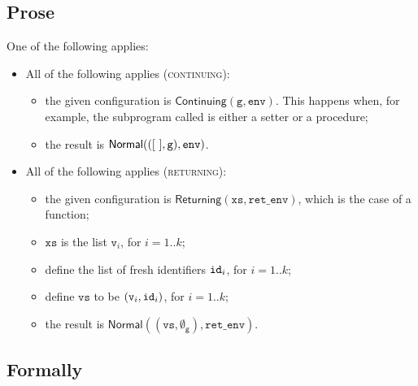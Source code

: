 \documentclass{book}
\newcommand\eqname[0]{\stackrel{\mathsmaller{\mathsf{is}}}{=}}
\newcommand\eqdef[0]{:=}
\newcommand\xgraph[0]{\textsf{g}}
\newcommand\emptygraph[0]{{\emptyset}_\xgraph}
\newcommand\evalarrow[0]{\stackrel{\mathsf{asl}}{\rightsquigarrow}}
\newcommand\matchfuncres[0]{\texttt{match\_func\_res}}
\newcommand\Normal[0]{\textsf{Normal}}
\newcommand\Continuing[0]{\textsf{Continuing}}
\newcommand\Returning[0]{\textsf{Returning}}
\newcommand\env[0]{\texttt{env}}
\newcommand\vg[0]{\texttt{g}}
\newcommand\vv[0]{\texttt{v}}
\newcommand\vvs[0]{\texttt{vs}}
\newcommand\xs[0]{\texttt{xs}}
\newcommand\retenv[0]{\texttt{ret\_env}}
\begin{document}
\subsection{Prose}
One of the following applies:
\begin{itemize}
  \item All of the following applies (\textsc{continuing}):
  \begin{itemize}
    \item the given configuration is $\Continuing(\vg, \env)$. This happens when,
    for example, the subprogram called is either a setter or a procedure;
    \item the result is $\Normal((\emptylist, \vg), \env)$.
  \end{itemize}

  \item All of the following applies (\textsc{returning}):
  \begin{itemize}
    \item the given configuration is $\Returning(\xs, \retenv)$, which is the case of a function;
    \item $\xs$ is the list $\vv_i$, for $i=1..k$;
    \item define the list of fresh identifiers $\texttt{id}_i$, for $i=1..k$;
    \item define $\vvs$ to be $(\vv_i, \id_i)$, for $i=1..k$;
    \item the result is $\Normal((\vvs, \emptygraph), \retenv)$.
  \end{itemize}
\end{itemize}

\begin{emptyformal}
\subsection{Formally}

\end{emptyformal}
\end{document}
